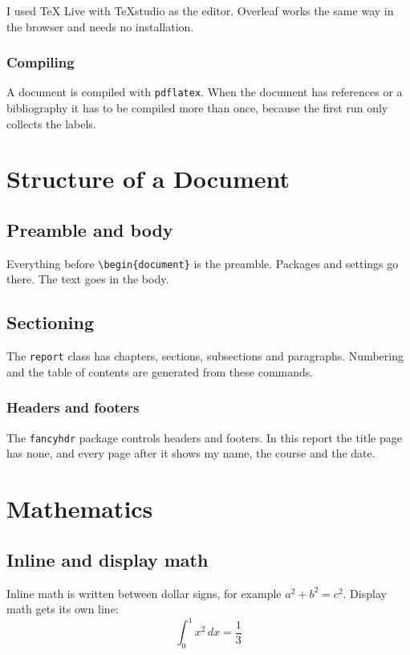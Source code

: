 \documentclass[12pt,a4paper]{report}
\begin{document}
I used TeX Live with TeXstudio as the editor. Overleaf works the same way in
the browser and needs no installation.

\subsection{Compiling}

A document is compiled with \texttt{pdflatex}. When the document has
references or a bibliography it has to be compiled more than once, because the
first run only collects the labels.

\chapter{Structure of a Document}

\section{Preamble and body}

Everything before \verb|\begin{document}| is the preamble. Packages and
settings go there. The text goes in the body.

\section{Sectioning}

The \texttt{report} class has chapters, sections, subsections and
paragraphs. Numbering and the table of contents are generated from these
commands.

\subsection{Headers and footers}

The \texttt{fancyhdr} package controls headers and footers. In this report the
title page has none, and every page after it shows my name, the course and the
date.

\chapter{Mathematics}

\section{Inline and display math}

Inline math is written between dollar signs, for example $a^2 + b^2 = c^2$.
Display math gets its own line:
\begin{equation}
    \int_0^1 x^2\,dx = \frac{1}{3}
\end{equation}
\end{document}
